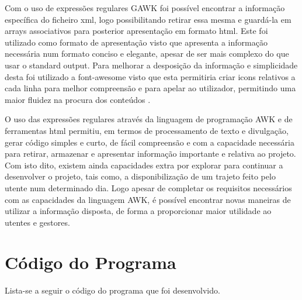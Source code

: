 \documentclass{report}
\begin{document}
Com o uso de expressões regulares GAWK foi possível encontrar a informação específica do ficheiro xml, logo possibilitando 
retirar essa mesma e guardá-la em arrays associativos
para posterior apresentação em formato html. Este foi utilizado como formato de apresentação visto que apresenta a informação 
necessária num formato conciso e elegante, 
apesar de ser mais complexo do que usar o standard output. Para melhorar a desposição da informação e simplicidade desta foi 
utilizado a font-awesome visto que esta permitiria criar 
icons relativos a cada linha para melhor compreensão e para apelar ao utilizador, permitindo uma maior fluidez na procura 
dos conteúdos .\par
O uso das expressões regulares através da linguagem de programação AWK e de ferramentas html permitiu, em termos de processamento 
de texto e divulgação, gerar código simples e curto,
de fácil compreensão e com a capacidade necessária para retirar, armazenar e apresentar informação importante e relativa ao projeto. 
Com isto dito, existem ainda capacidades extra
por explorar para continuar a desenvolver o projeto, tais como, a disponibilização de um trajeto feito pelo utente num determinado dia. 
Logo apesar de completar os requisitos necessários
com as capacidades da linguagem AWK, é possível encontrar novas maneiras de utilizar a informação disposta, de forma a proporcionar maior 
utilidade ao utentes e gestores.
   


\appendix 
\chapter{Código do Programa}

Lista-se a seguir o código  do programa  que foi desenvolvido.




\end{document}

